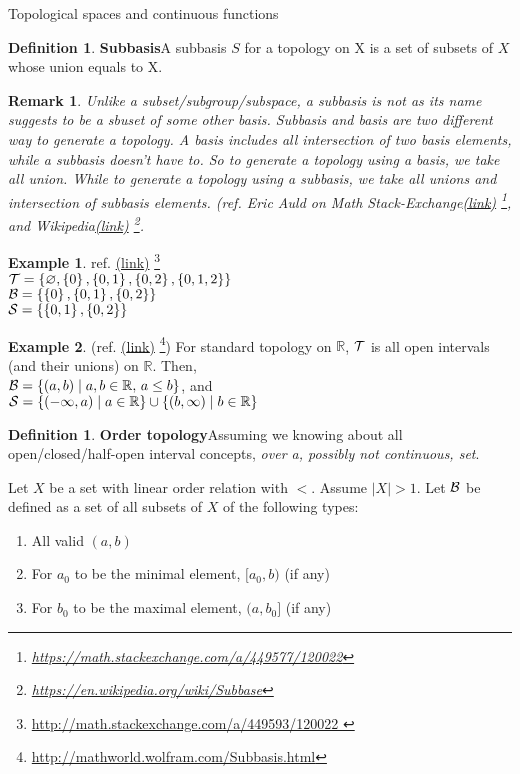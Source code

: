 \documentclass{report}
\let\emptyset\varnothing
\newcommand*{\link}[1]{\href{#1}{(\underline{link})}%
  \footnote{\url{#1}}}
\newtheorem*{remark}{Remark}
\theoremstyle{definition}
\newtheorem{definition}[theorem]{Definition}
\newtheorem{example}{Example}[theorem]
\newcommand{\defn}[1]{\textbf{#1}\label{#1}\index{#1}}
\newcommand{\set}[1]{\ensuremath\left\{#1\right\}}
\newcommand{\RR}{\mathbb{R}}
\begin{document}
\begin{chapter}{Topological spaces and continuous functions}
  \begin{definition}\defn{Subbasis}
    A subbasis $S$ for a topology on X is a set of subsets of $X$
    whose union equals to X.
  \end{definition}
  \begin{remark}
    Unlike a subset/subgroup/subspace, a subbasis is not as its name
    suggests to be a sbuset of some other basis. Subbasis and basis
    are two different way to generate a topology. A basis includes all
    intersection of two basis elements, while a subbasis doesn't have
    to. So to generate a topology using a basis, we take all
    union. While to generate a topology using a subbasis, we take all
    unions and intersection of subbasis elements. (ref. {Eric Auld on
      Math
      Stack-Exchange\link{https://math.stackexchange.com/a/449577/120022}},
    and Wikipedia\link{https://en.wikipedia.org/wiki/Subbase}.
  \end{remark}
  \begin{example}ref. \link{http://math.stackexchange.com/a/449593/120022
    }\\
    $\T=\set{\emptyset, \set{0}, \set{0,1}, \set{0,2}, \set{0,1,2}}$
    \\
    $\B=\set{\set{0},\set{0,1},\set{0,2}}$ \\
    $\mathcal{S}=\set{\set{0,1},\set{0,2}}$
  \end{example}
  \begin{example}
    (ref. \link{http://mathworld.wolfram.com/Subbasis.html}) For standard topology on $\RR$, $\mathcal{T}$ is all open intervals (and
    their unions) on $\RR$. Then, \\
    $\B=\set{(a,b)\mid a,b\in\RR,\,a\leq b}$, and \\
    $\mathcal{S}=\set{(-\infty,a)\mid
      a\in\RR}\cup\set{(b,\infty)\mid b\in \RR}$ \\

  \end{example}

  \begin{definition}\defn{Order topology}
    Assuming we knowing about all open/closed/half-open interval
    concepts, \emph{over a, possibly not continuous, set}.

    Let $X$ be a set with linear order relation with $<$. Assume
    $|X|>1$. Let $\mathcal{B}$ be defined as a set of all subsets of $X$ of the
    following types:
    \begin{enumerate}
    \item All valid $(a,b)$
    \item For $a_0$ to be the minimal element, $[a_0,b)$ (if any)
    \item For $b_0$ to be the maximal element, $(a,b_0]$ (if any)
    \end{enumerate}


\end{definition}
\end{chapter}
\end{document}
